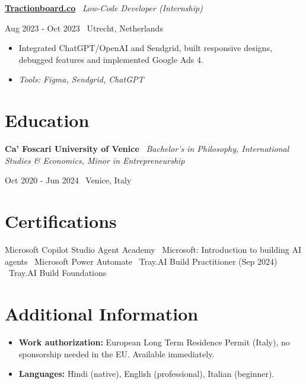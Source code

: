 \documentclass[a4paper,10pt]{article}
\newcommand{\role}[4]{%
 \vspace{2pt}\noindent
 \begin{minipage}[t]{0.70\textwidth}\raggedright\textbf{#1} \textbullet\ \textit{#3}\end{minipage}%
 \hfill
 \begin{minipage}[t]{0.28\textwidth}\raggedleft\footnotesize\color{gray}#2 \textbullet\ #4\end{minipage}%
 \vspace{1pt}%
}
\begin{document}
\role{\href{https://tractionboard.co}{Tractionboard.co}}{Aug 2023 - Oct 2023}{Low-Code Developer (Internship)}{Utrecht, Netherlands}
\begin{itemize}
 \item Integrated ChatGPT/OpenAI and Sendgrid, built responsive designs, debugged features and implemented Google Ads 4.
 \item \textit{Tools: Figma, Sendgrid, ChatGPT}
\end{itemize}

\section{Education}
\role{Ca' Foscari University of Venice}{Oct 2020 - Jun 2024}{Bachelor's in Philosophy, International Studies \& Economics, Minor in Entrepreneurship}{Venice, Italy}

\section{Certifications}
Microsoft Copilot Studio Agent Academy \textbullet\ Microsoft: Introduction to building AI agents \textbullet\ Microsoft Power Automate \textbullet\ Tray.AI Build Practitioner (Sep 2024) \textbullet\ Tray.AI Build Foundations

\section{Additional Information}
\begin{itemize}
 \item \textbf{Work authorization:} European Long Term Residence Permit (Italy), no sponsorship needed in the EU. Available immediately.
 \item \textbf{Languages:} Hindi (native), English (professional), Italian (beginner).
\end{itemize}

\end{document}
